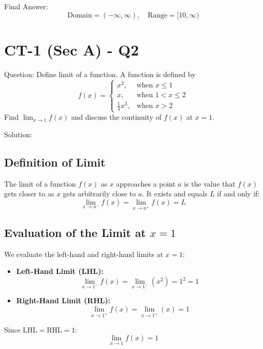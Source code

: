 \documentclass[11pt, a4paper]{article}
\begin{document}
Final Answer:
\[ 
\boxed{\text{Domain} = (-\infty, \infty), \quad \text{Range} = [10, \infty)} 
\]



\section*{CT-1 (Sec A) - Q2}

Question:
Define limit of a function. A function is defined by
\[ 
f(x) = \begin{cases} 
x^2, & \text{when } x \le 1 \\ 
x, & \text{when } 1 < x \le 2 \\ 
\frac{1}{4}x^3, & \text{when } x > 2 
\end{cases} 
\]
Find $\lim_{x \to 1} f(x)$ and discuss the continuity of $f(x)$ at $x = 1$.

Solution:

\subsection*{Definition of Limit}
The limit of a function $f(x)$ as $x$ approaches a point $a$ is the value that $f(x)$ gets closer to as $x$ gets arbitrarily close to $a$. It exists and equals $L$ if and only if:
\[ \lim_{x \to a^-} f(x) = \lim_{x \to a^+} f(x) = L \]

\subsection*{Evaluation of the Limit at $x = 1$}
We evaluate the left-hand and right-hand limits at $x = 1$:
\begin{itemize}
    \item \textbf{Left-Hand Limit (LHL):}
    \[ \lim_{x \to 1^-} f(x) = \lim_{x \to 1^-} (x^2) = 1^2 = 1 \]
    \item \textbf{Right-Hand Limit (RHL):}
    \[ \lim_{x \to 1^+} f(x) = \lim_{x \to 1^+} (x) = 1 \]
\end{itemize}
Since $\text{LHL} = \text{RHL} = 1$:
\[ \lim_{x \to 1} f(x) = 1 \]
\end{document}
